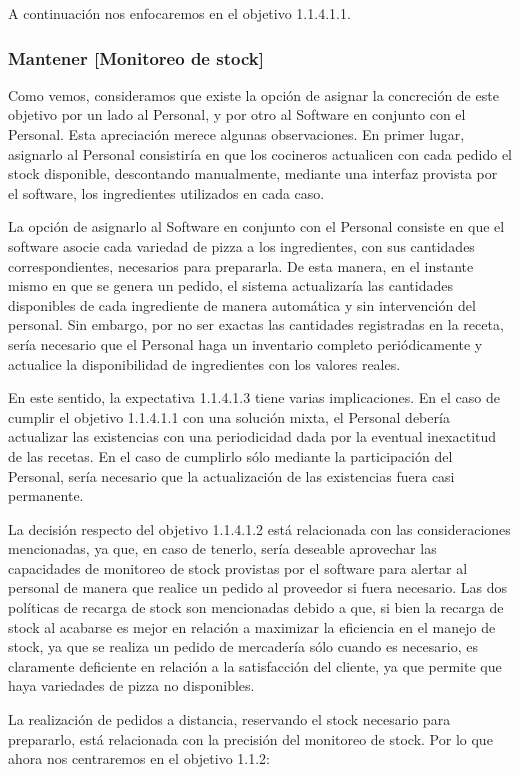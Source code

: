 \documentclass[a4paper,10pt]{article}
\begin{document}
A continuación nos enfocaremos en el objetivo 1.1.4.1.1. 
\subsubsection*{Mantener [Monitoreo de stock]}
Como vemos, consideramos que existe la opción de asignar la concreción de este objetivo por un lado al Personal, y por otro al Software en conjunto con el Personal. Esta apreciación merece algunas observaciones.
En primer lugar, asignarlo al Personal consistiría en que los cocineros actualicen con cada pedido el stock disponible, descontando manualmente, mediante una interfaz provista por el software, los ingredientes utilizados en cada caso.  


La opción de asignarlo al Software en conjunto con el Personal consiste en que el software asocie cada variedad de pizza a los ingredientes, con sus cantidades correspondientes, necesarios para prepararla. De esta manera, en el instante mismo en que se genera un pedido, el sistema actualizaría las cantidades disponibles de cada ingrediente de manera automática y sin intervención del personal. Sin embargo, por no ser exactas las cantidades registradas en la receta, sería necesario que el Personal haga un inventario completo periódicamente y actualice la disponibilidad de ingredientes con los valores reales.

En este sentido, la expectativa 1.1.4.1.3 tiene varias implicaciones. En el caso de cumplir el objetivo 1.1.4.1.1 con una solución mixta, el Personal debería actualizar las existencias con una periodicidad dada por la eventual inexactitud de las recetas. En el caso de cumplirlo sólo mediante la participación del Personal, sería necesario que la actualización de las existencias fuera casi permanente.

La decisión respecto del objetivo 1.1.4.1.2 está relacionada con las consideraciones mencionadas, ya que, en caso de tenerlo, sería deseable aprovechar las capacidades de monitoreo de stock provistas por el software para alertar al personal de manera que realice un pedido al proveedor si fuera necesario. Las dos políticas de recarga de stock son mencionadas debido a que, si bien la recarga de stock al acabarse es mejor en relación a maximizar la eficiencia en el manejo de stock, ya que se realiza un pedido de mercadería sólo cuando es necesario, es claramente deficiente en relación a la satisfacción del cliente, ya que permite que haya variedades de pizza no disponibles.


La realización de pedidos a distancia, reservando el stock necesario para prepararlo, está relacionada con la precisión del monitoreo de stock. Por lo que ahora nos centraremos en el objetivo 1.1.2:
\end{document}
